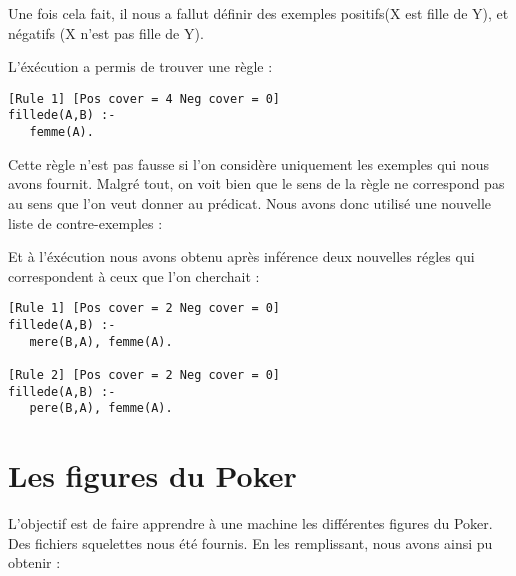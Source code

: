 \documentclass[11pt]{article} %
\begin{document}
Une fois cela fait, il nous a fallut définir des exemples positifs(X est fille de Y), et négatifs (X n'est pas fille de Y).



L'éxécution a permis de trouver une règle : 



\begin{lstlisting}
[Rule 1] [Pos cover = 4 Neg cover = 0]
fillede(A,B) :-
   femme(A).
\end{lstlisting}
Cette règle n'est pas fausse si l'on considère uniquement les exemples qui nous avons fournit. Malgré tout, on voit bien que le sens de la règle ne correspond pas au sens que l'on veut donner au prédicat. Nous avons donc utilisé une nouvelle liste de contre-exemples : 

Et à l'éxécution nous avons obtenu après inférence deux nouvelles régles qui correspondent à ceux que l'on cherchait : 
\begin{lstlisting}
[Rule 1] [Pos cover = 2 Neg cover = 0]
fillede(A,B) :-
   mere(B,A), femme(A).

[Rule 2] [Pos cover = 2 Neg cover = 0]
fillede(A,B) :-
   pere(B,A), femme(A).
\end{lstlisting}

\section{Les figures du Poker}

L'objectif est de faire apprendre à une machine les différentes figures du Poker.
Des fichiers squelettes nous été fournis.
En les remplissant, nous avons ainsi pu obtenir : 


\end{document}

